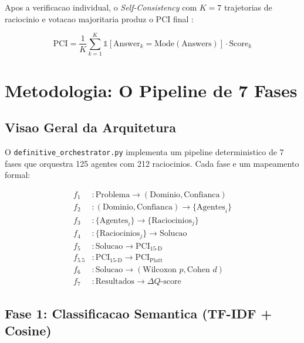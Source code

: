 \documentclass[5p]{elsarticle}
\begin{document}
Apos a verificacao individual, o \textit{Self-Consistency} com $K=7$ trajetorias
de raciocinio e votacao majoritaria produz o PCI final \cite{wang2022sc}:

\begin{equation}
\text{PCI} = \frac{1}{K} \sum_{k=1}^{K} \mathbb{1}[\text{Answer}_k = \text{Mode}(\text{Answers})] \cdot \text{Score}_k
\label{eq:pci}
\end{equation}

\section{Metodologia: O Pipeline de 7 Fases}

\subsection{Visao Geral da Arquitetura}

O \texttt{definitive\_orchestrator.py} implementa um pipeline deterministico de 7
fases que orquestra 125 agentes com 212 raciocinios. Cada fase e um mapeamento
formal:

\begin{align}
f_1 &: \text{Problema} \rightarrow (\text{Dominio}, \text{Confianca}) \label{eq:f1} \\
f_2 &: (\text{Dominio}, \text{Confianca}) \rightarrow \{\text{Agentes}_i\} \label{eq:f2} \\
f_3 &: \{\text{Agentes}_i\} \rightarrow \{\text{Raciocinios}_j\} \label{eq:f3} \\
f_4 &: \{\text{Raciocinios}_j\} \rightarrow \text{Solucao} \label{eq:f4} \\
f_5 &: \text{Solucao} \rightarrow \text{PCI}_{15\text{-D}} \label{eq:f5} \\
f_{5.5} &: \text{PCI}_{15\text{-D}} \rightarrow \text{PCI}_{\text{Platt}} \label{eq:f55} \\
f_6 &: \text{Solucao} \rightarrow (\text{Wilcoxon } p, \text{Cohen } d) \label{eq:f6} \\
f_7 &: \text{Resultados} \rightarrow \Delta Q\text{-score} \label{eq:f7}
\end{align}

\subsection{Fase 1: Classificacao Semantica (TF-IDF + Cosine)}
\end{document}
